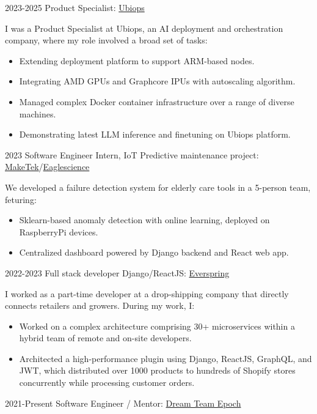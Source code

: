 \documentclass{article}
\begin{document}
\cvitem
{2023-2025}
{Product Specialist:}
{ \href{https://ubiops.com/}{Ubiops}}
{
I was a Product Specialist at Ubiops, an AI deployment and orchestration company, where my role involved a broad set of tasks: 
\begin{itemize}
\item Extending deployment platform to support ARM-based nodes. 
\item Integrating AMD GPUs and Graphcore IPUs with autoscaling algorithm. 
\item Managed complex Docker container infrastructure over a range of diverse machines. 
\item Demonstrating latest LLM inference and finetuning on Ubiops platform.
\end{itemize}
}
\cvitem
{2023}
{Software Engineer Intern, IoT Predictive maintenance project:}
{ \href{https://www.maketek.nl/}{MakeTek}/\href{https://www.eaglescience.nl/}{Eaglescience}}
{We developed a failure detection system for elderly care tools in a 5-person team, feturing:
\begin{itemize}
\item Sklearn-based anomaly detection with online learning, deployed on RaspberryPi devices.
\item Centralized dashboard powered by Django backend and React web app.
\end{itemize}
}
\cvitem
{2022-2023}
{Full stack developer Django/ReactJS:}
{ \href{https://everspring.app/nl/home}{Everspring}}
{I worked as a part-time developer at a drop-shipping company that directly connects retailers and growers. During my work, I:
\begin{itemize}
    \item Worked on a complex architecture comprising 30+ microservices within a hybrid team of remote and on-site developers.
    \item Architected a high-performance plugin using Django, ReactJS, GraphQL, and JWT, which distributed over 1000 products to hundreds of Shopify stores concurrently while processing customer orders.
\end{itemize}}
\cvitem
{2021-Present}
{Software Engineer / Mentor:}
{ \href{https://www.teamepoch.net/}{Dream Team Epoch}}
\end{document}
